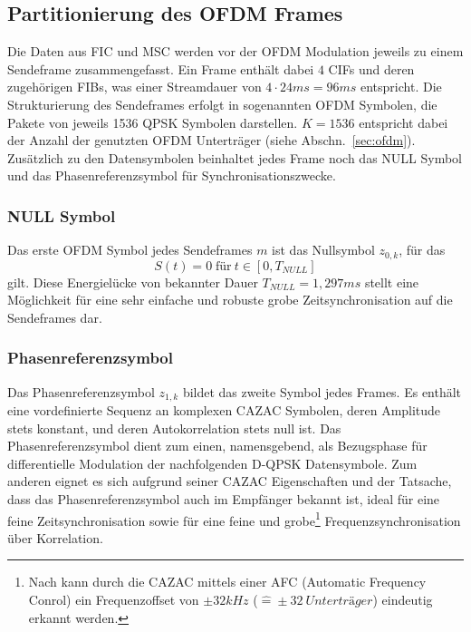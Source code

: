 



\subsection{Partitionierung des OFDM Frames}
\label{sec:transmission_frame}
Die Daten aus FIC und MSC werden vor der OFDM Modulation jeweils zu einem Sendeframe zusammengefasst. Ein Frame enthält dabei $4$ CIFs und deren zugehörigen FIBs, was einer Streamdauer von $4\cdot24ms = 96ms$ entspricht. Die Strukturierung des Sendeframes erfolgt in sogenannten OFDM Symbolen, die Pakete von jeweils 1536 QPSK Symbolen darstellen. $K=1536$ entspricht dabei der Anzahl der genutzten OFDM Unterträger (siehe Abschn.~\ref{sec:ofdm}). 
Zusätzlich zu den Datensymbolen beinhaltet jedes Frame noch das NULL Symbol und das Phasenreferenzsymbol für Synchronisationszwecke.

\subsubsection{NULL Symbol}
Das erste OFDM Symbol jedes Sendeframes $m$ ist das Nullsymbol $z_{0,k}$, für das
\begin{equation}
S(t) = 0 \; \text{für} \: t \in [0, T_{NULL}]
\end{equation}
gilt. Diese Energielücke von bekannter Dauer $T_{NULL} = 1,297ms$ stellt eine Möglichkeit für eine sehr einfache und robuste grobe Zeitsynchronisation auf die Sendeframes dar.

\subsubsection{Phasenreferenzsymbol}
\label{sec:phasenreferenzsymbol}
Das Phasenreferenzsymbol $z_{1,k}$ bildet das zweite Symbol jedes Frames. Es enthält eine vordefinierte Sequenz an komplexen \ac{CAZAC} Symbolen, deren Amplitude stets konstant, und deren Autokorrelation stets null ist. Das Phasenreferenzsymbol dient zum einen, namensgebend, als Bezugsphase für differentielle Modulation der nachfolgenden D-QPSK Datensymbole. Zum anderen eignet es sich aufgrund seiner \ac{CAZAC} Eigenschaften und der Tatsache, dass das Phasenreferenzsymbol auch im Empfänger bekannt ist, ideal für eine feine Zeitsynchronisation sowie für eine feine und grobe\footnote{Nach \cite{dab_buch} kann durch die CAZAC mittels einer AFC (Automatic Frequency Conrol) ein Frequenzoffset von $\pm 32kHz$ ($\hat{=} \pm 32 \: Unterträger$) eindeutig erkannt werden.} Frequenzsynchronisation über Korrelation.


